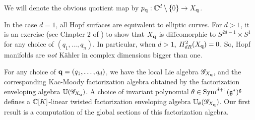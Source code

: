 We will denote the obvious quotient map by $p_{\bf q} : \mathbb C^d \setminus \{0\} \to X_{\bf q}$. 

\begin{rmk}
In the case $d=1$, all Hopf surfaces are equivalent to elliptic curves.
For $d>1$, it is an exercise (see Chapter 2 of \cite{KodairaDef}) to show that $X_{\bf q}$ is diffeomorphic to $S^{2d-1} \times S^1$ for any choice of $(q_1,\ldots,q_n)$. 
In particular, when $d > 1$, $H^{2}_{dR} (X_{\bf q}) = 0$.
So, Hopf manifolds are {\em not} K\"{a}hler in complex dimensions bigger than one. 
\end{rmk}


For any choice of ${\bf q} = (q_1,\ldots,q_d)$, we have the local Lie algebra $\mathscr G_{X_{\bf q}}$, and the corresponding Kac-Moody factorization algebra obtained by the factorization enveloping algebra $\mathbb U(\mathscr G_{X_{\bf q}})$.
A choice of invariant polynomial $\theta \in {\rm Sym}^{d+1}(\mathfrak g^*)^\mathfrak g$ defines a $\mathbb C[K]$-linear twisted factorization enveloping algebra $\mathbb U_{\theta}(\mathscr G_{X_{\bf q}})$.  
Our first result is a computation of the global sections of this factorization algebra.  

